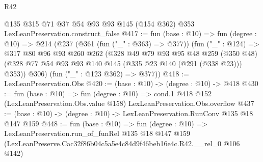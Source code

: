 \begin{lexlean}{R42}
\begin{coremodule}
    @135
    @315
    @71
    @37
    @54
    @93
    @93
    @145
    (@154 @362)
    @353
    LexLeanPreservation.construct_false
@417 := fun (base : @10) =>
  fun (degree : @10) =>
  @214
    (@237
      (@361 (fun ("_" : @363) => @377))
      (fun ("_" : @124) =>
      @317
        @80
        @96
        @93
        @260
        @262
        (@328
          @49
          @79
          @93
          @95
          @48
          @259
          (@350 @48)
          (@328 @77 @54 @93 @93 @140 @145 (@335 @23 @140 (@291 (@338 @23))) @353))
        @306)
      (fun ("_" : @123 @362) => @377))
@418 := LexLeanPreservation.Obs
@420 := (base : @10) -> (degree : @10) -> @418
@430 := fun (base : @10) =>
  fun (degree : @10) =>
  cond.{1} @418 @152 (LexLeanPreservation.Obs.value @158) LexLeanPreservation.Obs.overflow
@437 := (base : @10) -> (degree : @10) -> LexLeanPreservation.RunConv @135 @18 @147 @159
@448 := fun (base : @10) =>
  fun (degree : @10) =>
  LexLeanPreservation.run_of_funRel
    @135
    @18
    @147
    @159
    (LexLeanPreserve.Cac32f86b04c5a5e4c84d9f46beb16e4c.R42.__rel_0 @106 @142)
\end{coremodule}
\end{lexlean}
